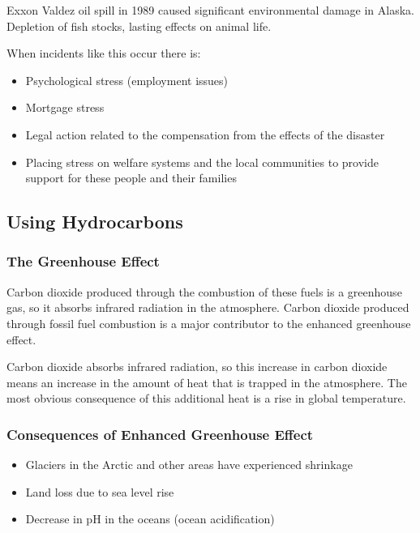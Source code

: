 		Exxon Valdez oil spill in 1989 caused significant environmental damage in Alaska. Depletion of fish stocks, lasting effects on animal life.

		When incidents like this occur there is:

			\begin{itemize}
				\item Psychological stress (employment issues)
				\item Mortgage stress
				\item Legal action related to the compensation from the effects of the disaster
				\item Placing stress on welfare systems and the local communities to provide support for these people and their families
			\end{itemize}

	\subsection{Using Hydrocarbons}
		
		\subsubsection{The Greenhouse Effect}
		
			Carbon dioxide produced through the combustion of these fuels is a greenhouse gas, so it absorbs infrared radiation in the atmosphere. Carbon dioxide produced through fossil fuel combustion is a major contributor to the enhanced greenhouse effect.

			Carbon dioxide absorbs infrared radiation, so this increase in carbon dioxide means an increase in the amount of heat that is trapped in the atmosphere. The most obvious consequence of this additional heat is a rise in global temperature.

		\subsubsection{Consequences of Enhanced Greenhouse Effect}
		
			\begin{itemize}
				\item Glaciers in the Arctic and other areas have experienced shrinkage
				\item Land loss due to sea level rise
				\item Decrease in pH in the oceans (ocean acidification)
			\end{itemize}


